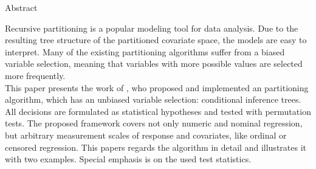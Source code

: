 \vspace*{4cm}
\begin{fullwidth}
\begin{center}
\huge{Abstract}
\end{center}
\thispagestyle{empty}
Recursive partitioning is a popular modeling tool for data analysis. 
Due to the resulting tree structure of the partitioned covariate space, the 
models are easy to interpret. Many of the existing partitioning algorithms suffer from a biased 
variable selection, meaning that variables with more possible values are selected
more frequently. \\
This paper presents the work of \citet{hothorn2006unbiased}, who proposed and implemented an 
partitioning algorithm, which has an unbiased variable selection: conditional inference trees. 
All decisions are formulated as statistical hypotheses and tested with permutation tests. The 
proposed framework covers not only numeric and nominal regression, but arbitrary measurement
scales of response and covariates, like ordinal or censored regression. 
This papers regards the algorithm in detail and illustrates it with two examples. 
Special emphasis is on the used test statistics. 
\end{fullwidth}
